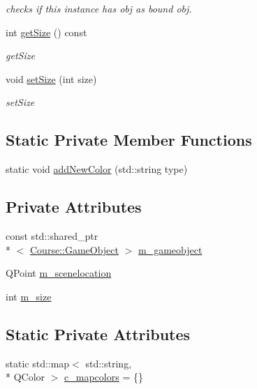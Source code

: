 \begin{DoxyCompactItemize}
\begin{DoxyCompactList}\small\item\em checks if this instance has obj as bound obj. \end{DoxyCompactList}\item 
int \hyperlink{classCourse_1_1SimpleMapItem_af80e162edd2c57e5f74b88cdc8113721}{get\-Size} () const 
\begin{DoxyCompactList}\small\item\em get\-Size \end{DoxyCompactList}\item 
void \hyperlink{classCourse_1_1SimpleMapItem_aaff1ad6f7daac8b91bb606d9d2b26f4a}{set\-Size} (int size)
\begin{DoxyCompactList}\small\item\em set\-Size \end{DoxyCompactList}\end{DoxyCompactItemize}
\subsection*{Static Private Member Functions}
\begin{DoxyCompactItemize}
\item 
static void \hyperlink{classCourse_1_1SimpleMapItem_ae00337284799adff891f10d4ec1396d5}{add\-New\-Color} (std\-::string type)
\end{DoxyCompactItemize}
\subsection*{Private Attributes}
\begin{DoxyCompactItemize}
\item 
const std\-::shared\-\_\-ptr\\*
$<$ \hyperlink{classCourse_1_1GameObject}{Course\-::\-Game\-Object} $>$ \hyperlink{classCourse_1_1SimpleMapItem_a4e067b04d171bb5e0a74f0f9c6419e95}{m\-\_\-gameobject}
\item 
Q\-Point \hyperlink{classCourse_1_1SimpleMapItem_a23c29a1b2a650ea0d9e5f7c1cc9a28f3}{m\-\_\-scenelocation}
\item 
int \hyperlink{classCourse_1_1SimpleMapItem_a68703106114f279f0fa103057d4b77af}{m\-\_\-size}
\end{DoxyCompactItemize}
\subsection*{Static Private Attributes}
\begin{DoxyCompactItemize}
\item 
static std\-::map$<$ std\-::string, \\*
Q\-Color $>$ \hyperlink{classCourse_1_1SimpleMapItem_adf954f1c53a9651e2634cd307be9aab4}{c\-\_\-mapcolors} = \{\}
\end{DoxyCompactItemize}


